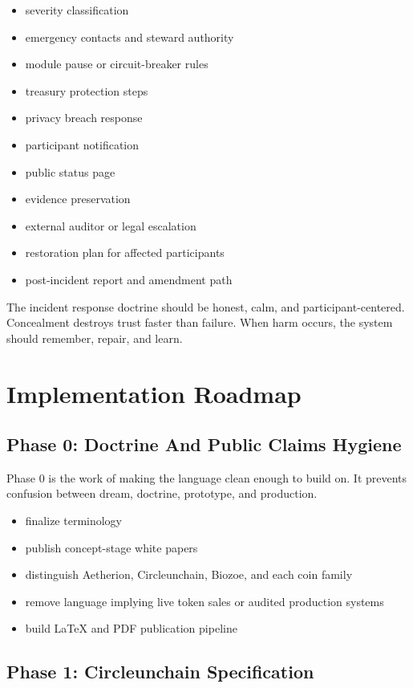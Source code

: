 \documentclass[12pt]{article}
\begin{document}
\begin{itemize}
  \item severity classification
  \item emergency contacts and steward authority
  \item module pause or circuit-breaker rules
  \item treasury protection steps
  \item privacy breach response
  \item participant notification
  \item public status page
  \item evidence preservation
  \item external auditor or legal escalation
  \item restoration plan for affected participants
  \item post-incident report and amendment path
\end{itemize}

The incident response doctrine should be honest, calm, and participant-centered. Concealment destroys trust faster than failure. When harm occurs, the system should remember, repair, and learn.

\section{Implementation Roadmap}

\subsection{Phase 0: Doctrine And Public Claims Hygiene}

Phase 0 is the work of making the language clean enough to build on. It prevents confusion between dream, doctrine, prototype, and production.

\begin{itemize}
  \item finalize terminology
  \item publish concept-stage white papers
  \item distinguish Aetherion, Circleunchain, Biozoe, and each coin family
  \item remove language implying live token sales or audited production systems
  \item build LaTeX and PDF publication pipeline
\end{itemize}

\subsection{Phase 1: Circleunchain Specification}
\end{document}

